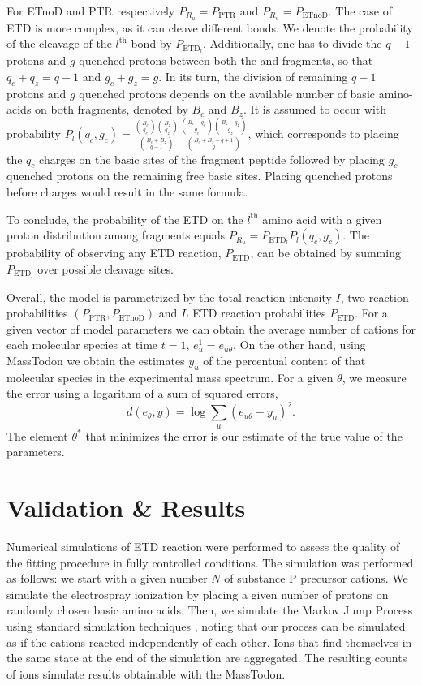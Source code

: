 \documentclass{llncs}
\begin{document}
For ETnoD and PTR respectively $P_{R_u}=P_\text{PTR}$ and $P_{R_u}=P_\text{ETnoD}$.
The case of ETD is more complex, as it can cleave different bonds. We denote the probability of the cleavage of the $l^\text{th}$ bond by $P_{\text{ETD}_l}$. Additionally, one has to divide the $q-1$ protons and $g$ quenched protons between both the  and  fragments, so that $q_c+q_z=q-1$ and $g_c+g_z = g$. In its turn, the division of remaining $q-1$ protons and $g$ quenched protons depends on the available number of basic amino-acids on both fragments, denoted by $B_c$ and $B_z$. It is assumed to occur with probability $P_l(q_c, g_c) = \frac{ \binom{B_c}{q_c}\binom{B_z}{q_z} }{ \binom{B_c+B_z}{q-1} } \frac{ \binom{B_c - q_c}{g_c} \binom{B_z-q_z}{g_z} }{ \binom{B_c+B_z-q+1}{g} }$,
which corresponds to placing the $q_c$ charges on the basic sites of the fragment peptide followed by placing $g_c$ quenched protons on the remaining free basic sites. Placing quenched protons before charges would result in the same formula.

To conclude, the probability of the ETD on the $l^\text{th}$ amino acid with a given proton distribution among fragments equals $P_{R_u}=P_{\text{ETD}_l} P_l(q_c, g_c)$. The probability of observing any ETD reaction, $P_\text{ETD}$, can be obtained by summing $P_{\text{ETD}_l}$ over possible cleavage sites.

Overall, the model is parametrized by the total reaction intensity $I$, two reaction probabilities $(P_\text{PTR}, P_\text{ETnoD})$ and $L$ ETD reaction probabilities $P_\text{ETD}$. For a given vector of model parameters  we can obtain the average number of cations for each molecular species at time $t=1$, $e_u^1 =e_{u\theta}$. On the other hand, using {\sc MassTodon} we obtain the estimates $y_u$ of the percentual content of that molecular species in the experimental mass spectrum. For a given $\theta$, we measure the error using a logarithm of a sum of squared errors, $$d(e_\theta,y) = \log \sum_u (e_{u\theta}-y_u)^2.$$
The element $\theta^*$ that minimizes the error is our estimate of the true value of the parameters.


\section{Validation \& Results}

Numerical simulations of ETD reaction were performed to assess the quality of the fitting procedure in fully controlled conditions. The simulation was performed as follows: we start with a given number $N$ of substance P precursor cations. We simulate the electrospray ionization by placing a given number of protons on randomly chosen basic amino acids. Then, we simulate the Markov Jump Process using standard simulation techniques \cite{Gillespie1977-fr}, noting that our process can be simulated as if the cations reacted independently of each other. Ions that find themselves in the same state at the end of the simulation are aggregated. The resulting counts of ions simulate results obtainable with the {\sc MassTodon}.
\end{document}

